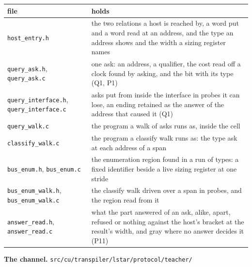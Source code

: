 {\small
\setlength{\tabcolsep}{6pt}
\begin{longtable}{>{\RaggedRight\arraybackslash}p{}>{\RaggedRight\arraybackslash}p{}}
\toprule
file & holds \\
\midrule
\endhead
\texttt{host\_\allowbreak{}entry.\allowbreak{}h} & the two relations a host is reached by, a word put and a word read at an address, and the type an address shows and the width a sizing register names \\
\texttt{query\_\allowbreak{}ask.\allowbreak{}h}, \texttt{query\_\allowbreak{}ask.\allowbreak{}c} & one ask: an address, a qualifier, the cost read off a clock found by asking, and the bit with its type (Q1, P1) \\
\texttt{query\_\allowbreak{}interface.\allowbreak{}h}, \texttt{query\_\allowbreak{}interface.\allowbreak{}c} & asks put from inside the interface in probes it can lose, an ending retained as the answer of the address that caused it (Q1) \\
\texttt{query\_\allowbreak{}walk.\allowbreak{}c} & the program a walk of asks runs as, inside the cell \\
\texttt{classify\_\allowbreak{}walk.\allowbreak{}c} & the program a classify walk runs as: the type ask at each address of a span \\
\texttt{bus\_\allowbreak{}enum.\allowbreak{}h}, \texttt{bus\_\allowbreak{}enum.\allowbreak{}c} & the enumeration region found in a run of types: a fixed identifier beside a live sizing register at one stride \\
\texttt{bus\_\allowbreak{}enum\_\allowbreak{}walk.\allowbreak{}h}, \texttt{bus\_\allowbreak{}enum\_\allowbreak{}walk.\allowbreak{}c} & the classify walk driven over a span in probes, and the region read from it \\
\texttt{answer\_\allowbreak{}read.\allowbreak{}h}, \texttt{answer\_\allowbreak{}read.\allowbreak{}c} & what the part answered of an ask, alike, apart, refused or nothing against the host's bracket at the result's width, and gray where no answer decides it (P11) \\
\bottomrule
\end{longtable}
}

\textbf{The channel.} \texttt{src/\allowbreak{}cu/\allowbreak{}transpiler/\allowbreak{}lstar/\allowbreak{}protocol/\allowbreak{}teacher/\allowbreak{}}

